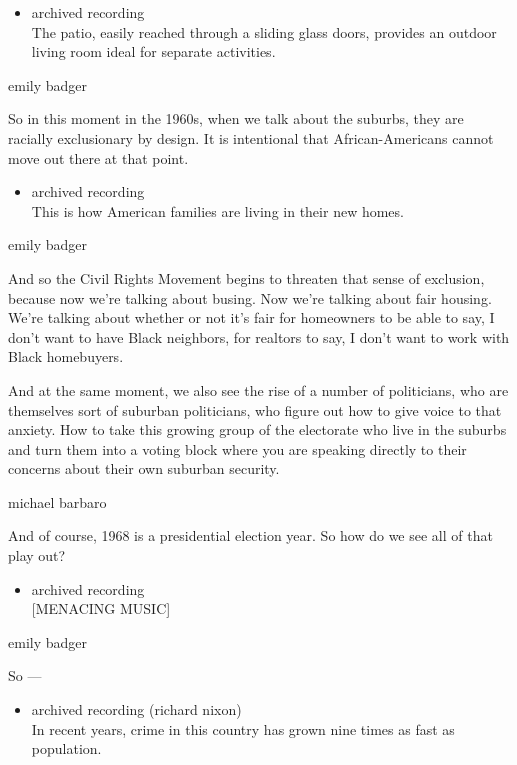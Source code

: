 \begin{itemize}
\tightlist
\item
  archived recording\\
  The patio, easily reached through a sliding glass doors, provides an
  outdoor living room ideal for separate activities.
\end{itemize}

emily badger

So in this moment in the 1960s, when we talk about the suburbs, they are
racially exclusionary by design. It is intentional that
African-Americans cannot move out there at that point.

\begin{itemize}
\tightlist
\item
  archived recording\\
  This is how American families are living in their new homes.
\end{itemize}

emily badger

And so the Civil Rights Movement begins to threaten that sense of
exclusion, because now we're talking about busing. Now we're talking
about fair housing. We're talking about whether or not it's fair for
homeowners to be able to say, I don't want to have Black neighbors, for
realtors to say, I don't want to work with Black homebuyers.

And at the same moment, we also see the rise of a number of politicians,
who are themselves sort of suburban politicians, who figure out how to
give voice to that anxiety. How to take this growing group of the
electorate who live in the suburbs and turn them into a voting block
where you are speaking directly to their concerns about their own
suburban security.

michael barbaro

And of course, 1968 is a presidential election year. So how do we see
all of that play out?

\begin{itemize}
\tightlist
\item
  archived recording\\
  {[}MENACING MUSIC{]}
\end{itemize}

emily badger

So ---

\begin{itemize}
\tightlist
\item
  archived recording (richard nixon)\\
  In recent years, crime in this country has grown nine times as fast as
  population.
\end{itemize}

